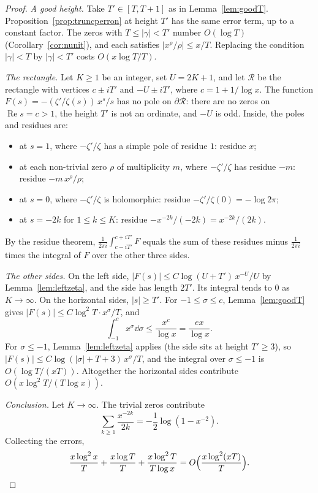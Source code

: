 \begin{proof}
\emph{A good height.} Take $T'\in[T,T+1]$ as in Lemma~\ref{lem:goodT}. Proposition~\ref{prop:truncperron} at height $T'$ has the same error term, up to a constant factor. The zeros with $T\le|\gamma|<T'$ number $O(\log T)$ (Corollary~\ref{cor:nunit}), and each satisfies $|x^\rho/\rho|\le x/T$. Replacing the condition $|\gamma|<T$ by $|\gamma|<T'$ costs $O(x\log T/T)$.

\emph{The rectangle.} Let $K\ge1$ be an integer, set $U=2K+1$, and let $\mathcal R$ be the rectangle with vertices $c\pm iT'$ and $-U\pm iT'$, where $c=1+1/\log x$. The function $F(s)=-(\zeta'/\zeta(s))\,x^s/s$ has no pole on $\partial\mathcal R$: there are no zeros on $\operatorname{Re}s=c>1$, the height $T'$ is not an ordinate, and $-U$ is odd. Inside, the poles and residues are:
\begin{itemize}
\item at $s=1$, where $-\zeta'/\zeta$ has a simple pole of residue $1$: residue $x$;
\item at each non-trivial zero $\rho$ of multiplicity $m$, where $-\zeta'/\zeta$ has residue $-m$: residue $-m\,x^\rho/\rho$;
\item at $s=0$, where $-\zeta'/\zeta$ is holomorphic: residue $-\zeta'/\zeta(0)=-\log2\pi$;
\item at $s=-2k$ for $1\le k\le K$: residue $-x^{-2k}/(-2k)=x^{-2k}/(2k)$.
\end{itemize}
By the residue theorem, $\frac1{2\pi i}\int_{c-iT'}^{c+iT'}F$ equals the sum of these residues minus $\frac1{2\pi i}$ times the integral of $F$ over the other three sides.

\emph{The other sides.} On the left side, $|F(s)|\le C\log(U+T')\,x^{-U}/U$ by Lemma~\ref{lem:leftzeta}, and the side has length $2T'$. Its integral tends to $0$ as $K\to\infty$. On the horizontal sides, $|s|\ge T'$. For $-1\le\sigma\le c$, Lemma~\ref{lem:goodT} gives $|F(s)|\le C\log^2T\cdot x^\sigma/T$, and
\[
\int_{-1}^c x^\sigma\dd\sigma\le\frac{x^c}{\log x}=\frac{ex}{\log x}.
\]
For $\sigma\le-1$, Lemma~\ref{lem:leftzeta} applies (the side sits at height $T'\ge3$), so $|F(s)|\le C\log(|\sigma|+T+3)\,x^\sigma/T$, and the integral over $\sigma\le-1$ is $O(\log T/(xT))$. Altogether the horizontal sides contribute $O(x\log^2T/(T\log x))$.

\emph{Conclusion.} Let $K\to\infty$. The trivial zeros contribute
\[
\sum_{k\ge1}\frac{x^{-2k}}{2k}=-\frac12\log(1-x^{-2}).
\]
Collecting the errors,
\[
\frac{x\log^2x}T+\frac{x\log T}T+\frac{x\log^2T}{T\log x}=O\Bigl(\frac{x\log^2(xT)}T\Bigr).
\]
\end{proof}

